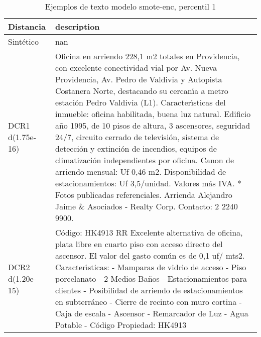 \begin{table}[H]
\centering
\fontsize{10}{14}\selectfont
\caption{Ejemplos de texto modelo smote-enc, percentil 1}
\label{table-example-economicos-b-2-smote-enc-1p-text}
\begin{tabular}{|l|m{35em}|}
\hline
\rowcolor[gray]{0.8}
Distancia & description \\
\hline Sintético & nan \\
\hline DCR1 d(1.75e-16) & Oficina en arriendo 228,1 m2 totales en Providencia, con excelente conectividad vial por Av. Nueva Providencia, Av. Pedro de Valdivia y Autopista Costanera Norte, destacando su cercan{\'\i}a a metro estaci\'on Pedro Valdivia (L1).  Caracter{\'\i}sticas del inmueble: oficina habilitada, buena luz natural. Edificio a\~no 1995, de 10 pisos de altura, 3 ascensores, seguridad 24/7, circuito cerrado de televisi\'on, sistema de detecci\'on y extinci\'on de incendios, equipos de climatizaci\'on independientes por oficina.  Canon de arriendo mensual: Uf 0,46 m2. Disponibilidad de estacionamientos: Uf 3,5/unidad. Valores m\'as IVA.  * Fotos publicadas referenciales. Arrienda Alejandro Jaime \& Asociados - Realty Corp. Contacto: 2 2240 9900. \\
\hline DCR2 d(1.20e-15) & C\'odigo: HK4913 RR  Excelente alternativa de oficina, plata libre en cuarto piso con acceso directo del ascensor. El valor del gasto com\'un es de 0,1 uf/ mts2.  Caracter{\'\i}sticas: - Mamparas de vidrio de acceso - Piso porcelanato - 2 Medios Ba\~nos - Estacionamientos para clientes - Posibilidad de arriendo de estacionamientos en subterr\'aneo - Cierre de recinto con muro cortina - Caja de escala - Ascensor - Remarcador de Luz - Agua Potable - C\'odigo Propiedad: HK4913 \\
\hline
\end{tabular}
\end{table}
